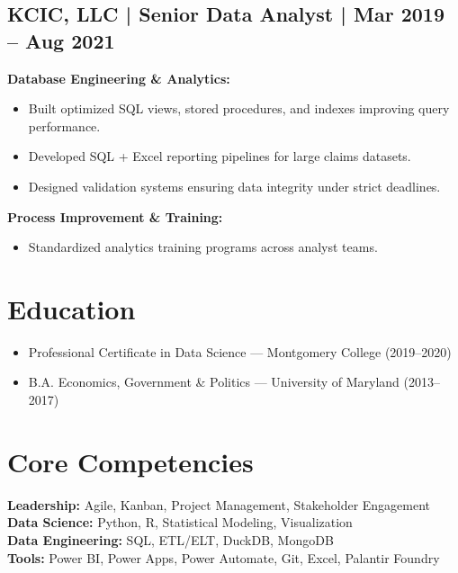 \documentclass{article}%
\begin{document}
\subsection{KCIC, LLC | Senior Data Analyst | Mar 2019 – Aug 2021}%
\label{subsec:KCIC,LLC|SeniorDataAnalyst|Mar2019Aug2021}%
\textbf{Database Engineering & Analytics:}\\%
\begin{itemize}%
\item Built optimized SQL views, stored procedures, and indexes improving query performance.%
\item Developed SQL + Excel reporting pipelines for large claims datasets.%
\item Designed validation systems ensuring data integrity under strict deadlines.%
\end{itemize}%
\textbf{Process Improvement & Training:}\\%
\begin{itemize}%
\item Standardized analytics training programs across analyst teams.%
\end{itemize}

%
\section{Education}%
\label{sec:Education}%
\begin{itemize}%
\item Professional Certificate in Data Science — Montgomery College (2019–2020)%
\item B.A. Economics, Government & Politics — University of Maryland (2013–2017)%
\end{itemize}

%
\section{Core Competencies}%
\label{sec:CoreCompetencies}%
\textbf{Leadership: } Agile, Kanban, Project Management, Stakeholder Engagement\\%
\textbf{Data Science: } Python, R, Statistical Modeling, Visualization\\%
\textbf{Data Engineering: } SQL, ETL/ELT, DuckDB, MongoDB\\%
\textbf{Tools: } Power BI, Power Apps, Power Automate, Git, Excel, Palantir Foundry\\

%
\end{document}
